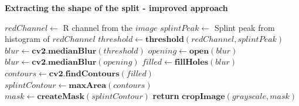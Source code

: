 \begin{algorithm}{\textbf{Extracting the shape of the split - improved approach}}
	\begin{spacing}{1.5}
	\begin{algorithmic}[1]
			\State $redChannel \gets$ R channel from the $image$
			\State $splintPeak \gets$ Splint peak from histogram of $redChannel$
			\State $threshold \gets \textbf{threshold}(redChannel, splintPeak)$
			\State $blur \gets \textbf{cv2.medianBlur}(threshold)$
				\State $opening \gets \textbf{open}(blur)$
				\State $blur \gets \textbf{cv2.medianBlur}(opening)$
			\EndFor
			\State $filled \gets \textbf{fillHoles}(blur)$
			\State $contours \gets \textbf{cv2.findContours}(filled)$
			\State $splintContour \gets \textbf{maxArea}(contours)$
			\State $mask \gets \textbf{createMask}(splintContour)$
			\State \textbf{return} $\textbf{cropImage}(grayscale, mask)$
		\EndFunction
	\end{algorithmic}
	\end{spacing}
\end{algorithm}

